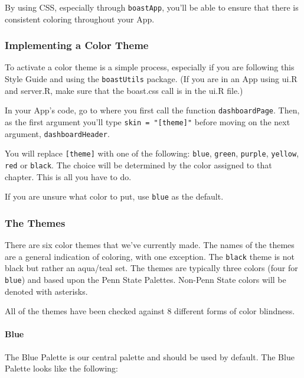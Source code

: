 \documentclass[
]{book}
\begin{document}
By using CSS, especially through \texttt{boastApp}, you'll be able to ensure that there is consistent coloring throughout your App.

\hypertarget{implementing-a-color-theme}{%
\subsubsection{Implementing a Color Theme}\label{implementing-a-color-theme}}

To activate a color theme is a simple process, especially if you are following this Style Guide and using the \texttt{boastUtils} package. (If you are in an App using ui.R and server.R, make sure that the boast.css call is in the ui.R file.)

In your App's code, go to where you first call the function \texttt{dashboardPage}. Then, as the first argument you'll type \texttt{skin\ =\ "{[}theme{]}"} before moving on the next argument, \texttt{dashboardHeader}.

You will replace \texttt{{[}theme{]}} with one of the following: \texttt{blue}, \texttt{green}, \texttt{purple}, \texttt{yellow}, \texttt{red} or \texttt{black}. The choice will be determined by the color assigned to that chapter. This is all you have to do.

If you are unsure what color to put, use \texttt{blue} as the default.

\hypertarget{the-themes}{%
\subsubsection{The Themes}\label{the-themes}}

There are six color themes that we've currently made. The names of the themes are a general indication of coloring, with one exception. The \texttt{black} theme is not black but rather an aqua/teal set. The themes are typically three colors (four for \texttt{blue}) and based upon the Penn State Palettes. Non-Penn State colors will be denoted with asterisks.

All of the themes have been checked against 8 different forms of color blindness.

\hypertarget{blue}{%
\paragraph{Blue}\label{blue}}

The Blue Palette is our central palette and should be used by default. The Blue Palette looks like the following:
\end{document}
